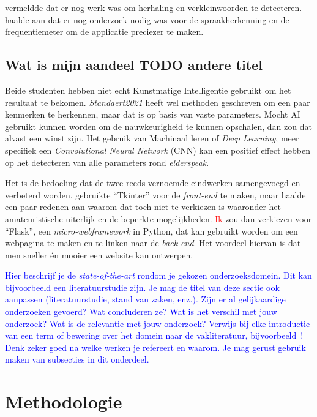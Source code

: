 \textcite{Beeckman2021} vermeldde dat er nog werk was om herhaling en verkleinwoorden te detecteren. \textcite{Standaert2021} haalde aan dat er nog onderzoek nodig was voor de spraakherkenning en de frequentiemeter om de applicatie preciezer te maken.

\subsection{Wat is mijn aandeel TODO andere titel}\label{subsec:watismijnadeel}

Beide studenten hebben niet echt Kunstmatige Intelligentie gebruikt om het resultaat te bekomen. \textit{Standaert2021} heeft wel methoden geschreven om een paar kenmerken te herkennen, maar dat is op basis van vaste parameters.
Mocht AI gebruikt kunnen worden om de nauwkeurigheid te kunnen opschalen, dan zou dat alvast een winst zijn.
Het gebruik van Machinaal leren of \textit{Deep Learning}, meer specifiek een \textit{Convolutional Neural Network} (CNN) kan een positief effect hebben op het detecteren van alle parameters rond \textit{elderspeak}.

Het is de bedoeling dat de twee reeds vernoemde eindwerken samengevoegd en verbeterd worden. \textcite{Beeckman2021} gebruikte ``Tkinter'' voor de \textit{front-end} te maken, maar haalde een paar redenen aan waarom dat toch niet te verkiezen is waaronder het amateuristische uiterlijk en de beperkte mogelijkheden.
\textcolor{red}{Ik} zou dan verkiezen voor ``Flask'', een \textit{micro-webframework} in Python, dat kan gebruikt worden om een webpagina te maken en te linken naar de \textit{back-end}.
Het voordeel hiervan is dat men sneller én mooier een website kan ontwerpen.

\textcolor{blue}{
Hier beschrijf je de \emph{state-of-the-art} rondom je gekozen onderzoeksdomein. Dit kan bijvoorbeeld een literatuurstudie zijn. Je mag de titel van deze sectie ook aanpassen (literatuurstudie, stand van zaken, enz.). Zijn er al gelijkaardige onderzoeken gevoerd? Wat concluderen ze? Wat is het verschil met jouw onderzoek? Wat is de relevantie met jouw onderzoek?
Verwijs bij elke introductie van een term of bewering over het domein naar de vakliteratuur, bijvoorbeeld~\autocite{Doll1954}! Denk zeker goed na welke werken je refereert en waarom.
Je mag gerust gebruik maken van subsecties in dit onderdeel.}


\section{Methodologie}
\label{sec:methodologie}

